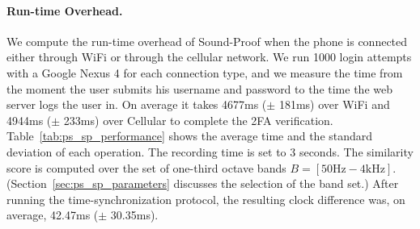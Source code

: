 \paragraph{Run-time Overhead.}

\begin{table}[!ht]
    \centering
    \caption[Overhead of the Sound-Proof prototype]{Overhead of the Sound-Proof
    prototype. On average it takes 4677ms ($\pm$ 181ms) over WiFi and 4944ms ($\pm$
    233ms) over Cellular to complete the 2FA verification.}
    \label{tab:ps_sp_performance}
\end{table}

We compute the run-time overhead of Sound-Proof when the phone is connected either through WiFi or through the cellular network.
We run 1000 login attempts with a Google Nexus 4 for each connection type, and we measure the time from the moment the user submits his username and password to the time the web server logs the user in. On average it takes 4677ms ($\pm$ 181ms) over WiFi and 4944ms ($\pm$ 233ms) over Cellular to complete the 2FA verification.
Table~\ref{tab:ps_sp_performance} shows the average time and the standard deviation of each operation.
The recording time is set to 3 seconds.
The similarity score is computed over the set of one-third octave bands $B=[50\text{Hz}-4\text{kHz}]$.
(Section~\ref{sec:ps_sp_parameters} discusses the selection of the band set.)
After running the time-synchronization protocol, the resulting clock difference was, on average, 42.47ms ($\pm$ 30.35ms).


